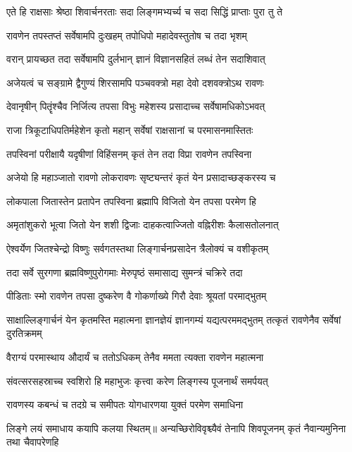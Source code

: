 \twolineshloka
{एते हि राक्षसाः श्रेष्ठा शिवार्चनरताः सदा}
{लिङ्गमभ्यर्च्य च सदा सिद्धिं प्राप्ताः पुरा तु ते}%

\twolineshloka
{रावणेन तपस्तप्तं सर्वेषामपि दुःखहम्}
{तपोधिपो महादेवस्तुतोष च तदा भृशम्}%

\twolineshloka
{वरान् प्रायच्छत तदा सर्वेषामपि दुर्लभान्}
{ज्ञानं विज्ञानसहितं लब्धं तेन सदाशिवात्}%

\twolineshloka
{अजेयत्वं च सङ्ग्रामे द्वैगुण्यं शिरसामपि}
{पञ्चवक्त्रो महा देवो दशवक्त्रोऽथ रावणः}%

\twolineshloka
{देवानृषीन् पितॄंश्चैव निर्जित्य तपसा विभुः}
{महेशस्य प्रसादाच्च सर्वेषामधिकोऽभवत्}%

\twolineshloka
{राजा त्रिकूटाधिपतिर्महेशेन कृतो महान्}
{सर्वेषां राक्षसानां च परमासनमास्तितः}%

\twolineshloka
{तपस्विनां परीक्षायै यदृषीणां विहिंसनम्}
{कृतं तेन तदा विप्रा रावणेन तपस्विना}%

\twolineshloka
{अजेयो हि महाञ्जातो रावणो लोकरावणः}
{सृष्ट्यन्तरं कृतं येन प्रसादाच्छङ्करस्य च}%

\twolineshloka
{लोकपाला जितास्तेन प्रतापेन तपस्विना}
{ब्रह्मापि विजितो येन तपसा परमेण हि}%

\twolineshloka
{अमृतांशुकरो भूत्वा जितो येन शशी द्विजाः}
{दाहकत्वाज्जितो वह्निरीशः कैलासतोलनात्}%

\twolineshloka
{ऐश्वर्येण जितश्चेन्द्रो विष्णुः सर्वगतस्तथा}
{लिङ्गार्चनप्रसादेन त्रैलोक्यं च वशीकृतम्}%

\twolineshloka
{तदा सर्वे सुरगणा ब्रह्मविष्णुपुरोगमाः}
{मेरुपृष्ठं समासाद्य सुमन्त्रं चक्रिरे तदा}%

\twolineshloka
{पीडिताः स्मो रावणेन तपसा दुष्करेण वै}
{गोकर्णाख्ये गिरौ देवाः श्रूयतां परमाद्भुतम्}%

\threelineshloka
{साक्षाल्लिङ्गार्चनं येन कृतमस्ति महात्मना}
{ज्ञानज्ञेयं ज्ञानगम्यं यद्यत्परममद्भुतम्}
{तत्कृतं रावणेनैव सर्वेषां दुरतिक्रमम्}%

\twolineshloka
{वैराग्यं परमास्थाय औदार्यं च ततोऽधिकम्}
{तेनैव ममता त्यक्ता रावणेन महात्मना}%

\twolineshloka
{संवत्सरसहस्राच्च स्वशिरो हि महाभुजः}
{कृत्त्वा करेण लिङ्गस्य पूजनार्थं समर्पयत्}%

\twolineshloka
{रावणस्य कबन्धं च तदग्रे च समीपतः}
{योगधारणया युक्तं परमेण समाधिना}%

\threelineshloka
{लिङ्गे लयं समाधाय कयापि कलया स्थितम्॥}
{अन्यच्छिरोविवृश्च्यैवं तेनापि शिवपूजनम्}
{कृतं नैवान्यमुनिना तथा चैवापरेणहि}%

